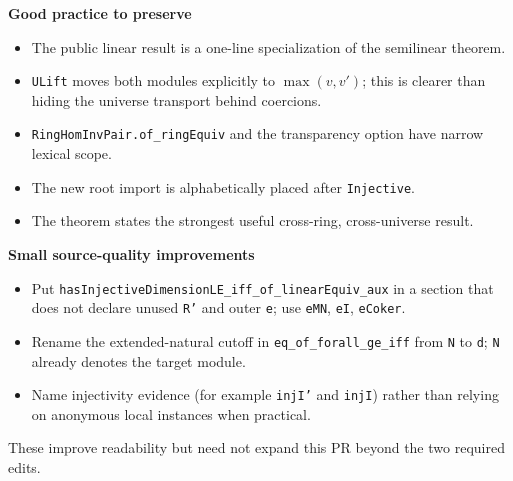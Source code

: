 \documentclass[10pt]{article}
\begin{document}
\begin{center}
\end{center}

\textbf{Good practice to preserve}
\begin{itemize}
\item The public linear result is a one-line specialization of the semilinear theorem.
\item \texttt{ULift} moves both modules explicitly to \(\max(v,v')\); this is clearer than hiding
      the universe transport behind coercions.
\item \texttt{RingHomInvPair.of\_ringEquiv} and the transparency option have narrow lexical scope.
\item The new root import is alphabetically placed after \texttt{Injective}.
\item The theorem states the strongest useful cross-ring, cross-universe result.
\end{itemize}

\textbf{Small source-quality improvements}
\begin{itemize}
\item Put \texttt{hasInjectiveDimensionLE\_iff\_of\_linearEquiv\_aux} in a section that does not
      declare unused \texttt{R'} and outer \texttt{e}; use \texttt{eMN}, \texttt{eI},
      \texttt{eCoker}.
\item Rename the extended-natural cutoff in \texttt{eq\_of\_forall\_ge\_iff} from \texttt{N} to
      \texttt{d}; \texttt{N} already denotes the target module.
\item Name injectivity evidence (for example \texttt{injI'} and \texttt{injI}) rather than relying
      on anonymous local instances when practical.
\end{itemize}
These improve readability but need not expand this PR beyond the two required edits.
\end{document}
